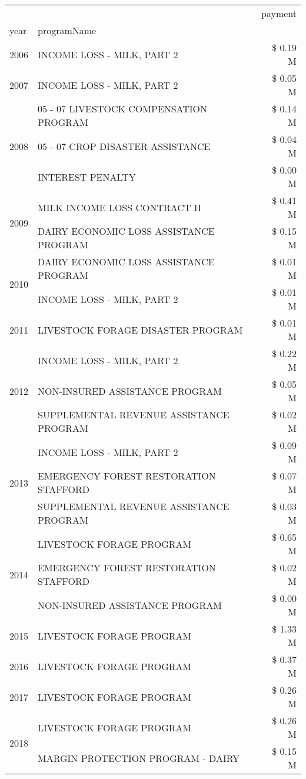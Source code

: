 \begin{tabular}{llr}
\toprule
 &  & payment \\
year & programName &  \\
\midrule
2006 & INCOME LOSS - MILK, PART 2 & \$ 0.19 M \\
\cline{1-3}
2007 & INCOME LOSS - MILK, PART 2 & \$ 0.05 M \\
\cline{1-3}
\multirow[t]{3}{*}{2008} & 05 - 07 LIVESTOCK COMPENSATION PROGRAM & \$ 0.14 M \\
 & 05 - 07 CROP DISASTER ASSISTANCE & \$ 0.04 M \\
 & INTEREST PENALTY & \$ 0.00 M \\
\cline{1-3}
\multirow[t]{2}{*}{2009} & MILK INCOME LOSS CONTRACT II & \$ 0.41 M \\
 & DAIRY ECONOMIC LOSS ASSISTANCE PROGRAM & \$ 0.15 M \\
\cline{1-3}
\multirow[t]{2}{*}{2010} & DAIRY ECONOMIC LOSS ASSISTANCE PROGRAM & \$ 0.01 M \\
 & INCOME LOSS - MILK, PART 2 & \$ 0.01 M \\
\cline{1-3}
2011 & LIVESTOCK FORAGE DISASTER PROGRAM & \$ 0.01 M \\
\cline{1-3}
\multirow[t]{3}{*}{2012} & INCOME LOSS - MILK, PART 2 & \$ 0.22 M \\
 & NON-INSURED ASSISTANCE PROGRAM & \$ 0.05 M \\
 & SUPPLEMENTAL REVENUE ASSISTANCE PROGRAM & \$ 0.02 M \\
\cline{1-3}
\multirow[t]{3}{*}{2013} & INCOME LOSS - MILK, PART 2 & \$ 0.09 M \\
 & EMERGENCY FOREST RESTORATION STAFFORD & \$ 0.07 M \\
 & SUPPLEMENTAL REVENUE ASSISTANCE PROGRAM & \$ 0.03 M \\
\cline{1-3}
\multirow[t]{3}{*}{2014} & LIVESTOCK FORAGE PROGRAM & \$ 0.65 M \\
 & EMERGENCY FOREST RESTORATION STAFFORD & \$ 0.02 M \\
 & NON-INSURED ASSISTANCE PROGRAM & \$ 0.00 M \\
\cline{1-3}
2015 & LIVESTOCK FORAGE PROGRAM & \$ 1.33 M \\
\cline{1-3}
2016 & LIVESTOCK FORAGE PROGRAM & \$ 0.37 M \\
\cline{1-3}
2017 & LIVESTOCK FORAGE PROGRAM & \$ 0.26 M \\
\cline{1-3}
\multirow[t]{3}{*}{2018} & LIVESTOCK FORAGE PROGRAM & \$ 0.26 M \\
 & MARGIN PROTECTION PROGRAM - DAIRY & \$ 0.15 M \\

\end{tabular}
